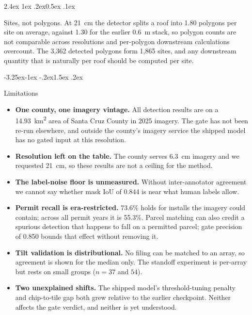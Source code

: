 \documentclass[10pt,twocolumn]{article}
\makeatletter
\renewcommand\subsection{\@startsection{subsection}{2}{\z@}%
  {-3.25ex\@plus -1ex \@minus -.2ex}{1.5ex \@plus .2ex}%
  {\normalfont\large\bfseries\raggedright}}
\renewcommand\paragraph{\@startsection{paragraph}{4}{\z@}%
  {2.4ex \@plus1ex \@minus.2ex}{0.5ex \@plus .1ex}%
  {\normalfont\normalsize\bfseries\raggedright}}
\makeatother
\begin{document}
\paragraph{Sites, not polygons.}
At \SI{21}{\centi\metre} the detector splits a roof into 1.80 polygons per site on average,
against 1.30 for the earlier \SI{0.6}{\metre} stack, so polygon counts are not comparable
across resolutions and per-polygon downstream calculations overcount. The 3{,}362 detected
polygons form 1{,}865 sites, and any downstream quantity that is naturally per roof should
be computed per site.

\subsection{Limitations}
\label{sec:limitations}

\begin{itemize}\itemsep2pt
\item \textbf{One county, one imagery vintage.} All detection results are on a
\SI{14.93}{\kilo\metre\squared} area of Santa Cruz County in 2025 imagery. The gate has
not been re-run elsewhere, and outside the county's imagery service the shipped model has
no gated input at this resolution.
\item \textbf{Resolution left on the table.} The county serves \SI{6.3}{\centi\metre}
imagery and we requested \SI{21}{\centi\metre}, so these results are not a ceiling for the
method.
\item \textbf{The label-noise floor is unmeasured.} Without inter-annotator agreement we
cannot say whether mask IoU of 0.844 is near what human labels allow.
\item \textbf{Permit recall is era-restricted.} 73.6\% holds for installs the imagery
could contain; across all permit years it is 55.3\%. Parcel matching can also credit a
spurious detection that happens to fall on a permitted parcel; gate precision of 0.850
bounds that effect without removing it.
\item \textbf{Tilt validation is distributional.} No filing can be matched to an array, so
agreement is shown for the median only. The standoff experiment is per-array but rests on
small groups ($n=37$ and $54$).
\item \textbf{Two unexplained shifts.} The shipped model's threshold-tuning penalty and
chip-to-tile gap both grew relative to the earlier checkpoint. Neither affects the gate
verdict, and neither is yet understood.
\end{itemize}
\end{document}
